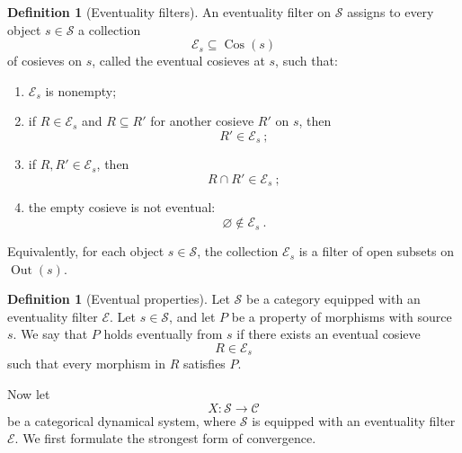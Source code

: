 \documentclass[a4paper,reqno,oneside]{amsart}
\theoremstyle{definition}
\newtheorem{definition}[theorem]{Definition}
\theoremstyle{remark}
\numberwithin{equation}{section}
\begin{document}
	
	\begin{definition}[Eventuality filters]
		An eventuality filter on $\mathcal S$ assigns to every object $s\in\mathcal S$ a collection
		\begin{equation}
			\mathcal E_s\subseteq \operatorname{Cos}(s)
		\end{equation}
		of cosieves on $s$, called the eventual cosieves at $s$, such that:
		
		\begin{enumerate}
			\item $\mathcal E_s$ is nonempty;
			
			\item if $R\in\mathcal E_s$ and $R\subseteq R'$ for another cosieve
			$R'$ on $s$, then
			\begin{equation}
				R'\in\mathcal E_s \ ;
			\end{equation}
			
			\item if $R,R'\in\mathcal E_s$, then
			\begin{equation}
				R\cap R'\in\mathcal E_s \ ;
			\end{equation}
			
			\item the empty cosieve is not eventual:
			\begin{equation}
				\varnothing\notin\mathcal E_s \ .
			\end{equation}
		\end{enumerate}
	\end{definition}
	
	Equivalently, for each object $s\in\mathcal S$, the collection $\mathcal E_s$ is a filter of open subsets on $\operatorname{Out}(s)$.
	
	
	
	
	
	\begin{definition}[Eventual properties]
		Let $\mathcal S$ be a category equipped with an eventuality filter $\mathcal E$. Let $s\in\mathcal S$, and let $P$ be a property of morphisms
		with source $s$. We say that $P$ holds eventually from $s$ if there exists
		an eventual cosieve
		\begin{equation}
			R\in\mathcal E_s
		\end{equation}
		such that every morphism in $R$ satisfies $P$.
	\end{definition}
	
	Now let
	\begin{equation}
		X\colon \mathcal S\to\mathcal C
	\end{equation}
	be a categorical dynamical system, where $\mathcal S$ is equipped with an
	eventuality filter $\mathcal E$. We first formulate the strongest form of convergence.
	
\end{document}
